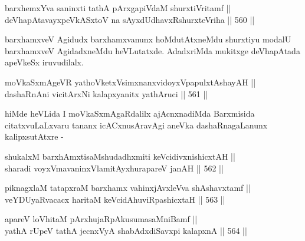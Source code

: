 \begin{shl}
barxhemxYva saninxti tathA pArxgapiVdaM shurxtiVritamf || \\
deVhapAtavayxpeVkASx\s toV na sAyxdUdhavxRshurxteVriha \hfill || 560 ||  
\end{shl}

\begin{artha}
barxhamxveV Agidudx barxhamxvanunx hoMdutAtxneMdu shurxtiyu modalU barxhamxveV AgidadxneMdu heVLutatxde. AdadxriMda mukitxge deVhapAtada apeVkeSx iruvudilalx.
\end{artha}


\begin{shl}
moVkaSxmAgeVR yathoVketxV\s simxnanxvidoyxVpapulxtAshayAH || \\
dashaRnAni vicitArxNi kalapxyanitx yathAruci \hfill || 561 ||  
\end{shl}

\begin{artha}
hiMde heVLida I moVkaSxmAgaRdalilx ajAcnxnadiMda Barxmisida
citatxvuLaLxvaru tananx icACxnusAravAgi aneVka dashaRnagaLanunx
kalipxsutAtxre -
\end{artha}



\begin{shl}
shukalxM barxhAmxtisaMshudadhxmiti keVcidivxnishicxtAH || \\
sharadi voyxVmavaninxVlamitAyxhurapareV janAH \hfill || 562 ||  
\end{shl}

\begin{shl}
piknagxlaM tatapxraM barxhamx vahinxjAvxleVva shAshavxtamf || \\
veYDUyaRvacacx haritaM keVcidAhuviRpashicxtaH \hfill || 563 ||  
\end{shl}

\begin{shl}
apareV loVhitaM pArxhujaRpAkusumasaMniBamf || \\
yathA rUpeV tathA jecnxVyA shabAdxdiSavxpi kalapxnA \hfill || 564 ||  
\end{shl}

